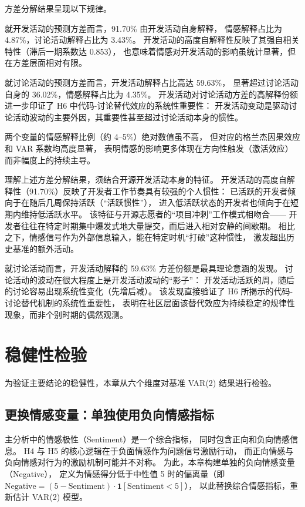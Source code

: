 方差分解结果呈现以下规律。

就开发活动的预测方差而言，91.70\% 由开发活动自身解释，
情感解释占比为 4.87\%，讨论活动解释占比为 3.43\%。
开发活动的高度自解释性反映了其强自相关特性（滞后一期系数达 0.853），
也意味着情感对开发活动的影响虽统计显著，但在方差层面相对有限。

就讨论活动的预测方差而言，开发活动解释占比高达 59.63\%，
显著超过讨论活动自身的 36.02\%，情感解释占比为 4.35\%。
开发活动对讨论活动方差的高解释份额进一步印证了 H6 中代码-讨论替代效应的系统性重要性：
开发活动变动是驱动讨论活动波动的主要外因，其重要性甚至超过讨论活动本身的惯性。

两个变量的情感解释比例（约 4--5\%）绝对数值虽不高，
但对应的格兰杰因果效应和 VAR 系数均高度显著，
表明情感的影响更多体现在方向性触发（激活效应）而非幅度上的持续主导。

理解上述方差分解结果，须结合开源开发活动本身的特征。
开发活动的高度自解释性（91.70\%）反映了开发者工作节奏具有较强的个人惯性：
已活跃的开发者倾向于在随后几周保持活跃（“活跃惯性”），
进入低活跃状态的开发者也倾向于在短期内维持低活跃水平。
该特征与开源志愿者的“项目冲刺”工作模式相吻合——
开发者往往在特定时期集中爆发式地大量提交，而后进入相对安静的间歇期。
相比之下，情感信号作为外部信息输入，能在特定时机“打破”这种惯性，
激发超出历史基准的额外活动。

就讨论活动而言，开发活动解释的 59.63\% 方差份额是最具理论意涵的发现。
讨论活动的波动在很大程度上是开发活动波动的“影子”：
开发活动活跃的周，随后的讨论容易出现系统性变化（先增后减）。
该发现直接验证了 H6 所揭示的代码-讨论替代机制的系统性重要性，
表明在社区层面该替代效应为持续稳定的规律性现象，而非个别时期的偶然观测。


\section{稳健性检验}
\label{sec:robust-2}

为验证主要结论的稳健性，本章从六个维度对基准 VAR(2) 结果进行检验。

\subsection{更换情感变量：单独使用负向情感指标}

主分析中的情感极性（Sentiment）是一个综合指标，
同时包含正向和负向情感信息。
H4 与 H5 的核心逻辑在于负面情感作为问题信号激励行动，
而正向情感与负向情感对行为的激励机制可能并不对称。
为此，本章构建单独的负向情感变量（Negative），
定义为情感得分低于中性值 5 时的偏离量（即 $\text{Negative} = (5 - \text{Sentiment}) \cdot \mathbf{1}[\text{Sentiment} < 5]$），
以此替换综合情感指标，重新估计 VAR(2) 模型。

